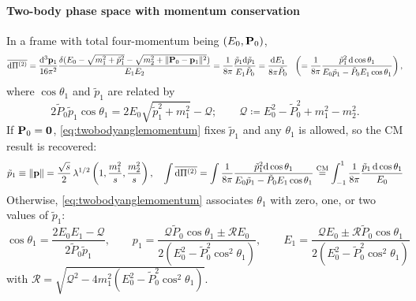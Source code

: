 \documentclass[CheatSheet]{subfiles}
\begin{document}
\paragraph{Two-body phase space with momentum conservation}
In a frame with total four-momentum being $(E_0,{\mathbf{P}}_0)$,
\begin{equation}
\overline{{\mathrm{d}}\Pi^{(2)}}
=\frac{{\mathrm{d}}^3{\mathbf{p}}_1}{16\pi^2}\frac{\delta(E_0-\sqrt{m_1^2+\tilde p_1^2}-\sqrt{m_2^2+\|{\mathbf{P}}_0-{\mathbf{p}}_1\|^2})}{E_1E_2}
=\frac{1}{8\pi}\frac{\tilde p_1{\mathrm{d}} \tilde p_1}{E_1\tilde P_0}
=\frac{{\mathrm{d}} E_1}{8\pi\tilde P_0}
~~\left(=\frac{1}{8\pi}\frac{\tilde p_1^2\,{\mathrm{d}}\cos\theta_{1}}{E_0\tilde p_1-\tilde P_0E_1\cos\theta_1}\right),
\label{eq:twobodypsgeneral}
\end{equation}
where $\cos\theta_1$ and $\tilde p_1$ are related by
\begin{equation}
 2\tilde P_0 \tilde p_1\cos\theta_1 = 2E_0 \sqrt{\tilde p_1^2+m_1^2}-\mathcal Q;
\qquad \mathcal Q \coloneq  E_0^2 -\tilde P_0^2 +  m_1^2 - m_2^2.
\label{eq:twobodyanglemomentum}
\end{equation}
If ${\mathbf{P}}_0={\mathbf{0}}$, \cref{eq:twobodyanglemomentum} fixes $\tilde p_1$ and any $\theta_1$ is allowed, so the CM result is recovered:
\begin{equation}
\tilde p_1\equiv\|\vc p\|=\frac{\sqrt{s}}{2}\Kallen[1/2]\left(1,\frac{m_1^2}{s},\frac{m_2^2}{s}\right),\quad
\int\overline{\dd\Pi^{(2)}}
=\int\frac{1}{8\pi}\frac{\tilde p_1^2\dd\cos\theta_{1}}{E_0\tilde p_1-\tilde P_0E_1\cos\theta_1}
\stackrel{\text{CM}}{=} \int_{-1}^1\frac{1}{8\pi}\frac{\tilde p_1\,\dd\cos\theta_{1}}{E_0}
\end{equation}
Otherwise, \cref{eq:twobodyanglemomentum} associates $\theta_1$ with zero, one, or two values of $\tilde p_1$:
\begin{equation}
 \cos\theta_1 = \frac{2E_0E_1-\mathcal Q}{2\tilde P_0\tilde p_1},\qquad
p_1=\frac{\mathcal Q\tilde P_0\cos\theta_1
 \pm \mathcal R E_0
}{2(E_0^2-\tilde P_0^2\cos^2\theta_1)},\qquad
E_1=\frac{\mathcal QE_0
 \pm \mathcal R\tilde P_0\cos\theta_1
}{2(E_0^2-\tilde P_0^2\cos^2\theta_1)}
\end{equation}
with $\mathcal R = \sqrt{\mathcal Q^2-4m_1^2(E_0^2-\tilde P_0^2\cos^2\theta_1)}$.
\end{document}
